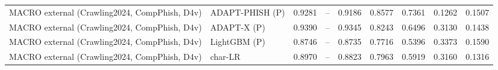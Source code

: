 \begin{table}[t]
\begin{tabular}{llrrrrrrr}
MACRO external (Crawling2024, CompPhish, D4v) & ADAPT-PHISH (P) & 0.9281 & -- & 0.9186 & 0.8577 & 0.7361 & 0.1262 & 0.1507 \\
MACRO external (Crawling2024, CompPhish, D4v) & ADAPT-X (P) & 0.9390 & -- & 0.9345 & 0.8243 & 0.6496 & 0.3130 & 0.1438 \\
MACRO external (Crawling2024, CompPhish, D4v) & LightGBM (P) & 0.8746 & -- & 0.8735 & 0.7716 & 0.5396 & 0.3373 & 0.1590 \\
MACRO external (Crawling2024, CompPhish, D4v) & char-LR & 0.8970 & -- & 0.8823 & 0.7963 & 0.5919 & 0.3160 & 0.1316 \\
\bottomrule
\end{tabular}
\end{table}